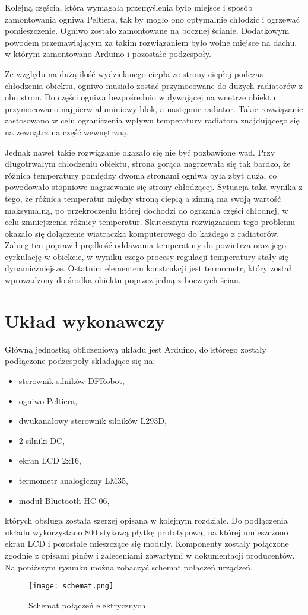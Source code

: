 Kolejną częścią, która wymagała przemyślenia było miejsce i sposób zamontowania ogniwa Peltiera, tak by mogło ono optymalnie chłodzić i ogrzewać pomieszczenie. Ogniwo zostało zamontowane na bocznej ścianie. Dodatkowym powodem przemawiającym za takim rozwiązaniem było wolne miejsce na dachu, w którym zamontowano Arduino i pozostałe podzespoły.

Ze względu na dużą ilość wydzielanego ciepła ze strony ciepłej podczas chłodzenia obiektu, ogniwo musiało zostać przymocowane do dużych radiatorów z obu stron. Do części ogniwa bezpośrednio wpływającej na wnętrze obiektu przymocowano najpierw aluminiowy blok, a następnie radiator. Takie rozwiązanie zastosowano w celu ograniczenia wpływu temperatury radiatora znajdującego się na zewnątrz na część wewnętrzną. 

Jednak nawet takie rozwiązanie okazało się nie być pozbawione wad. Przy długotrwałym chłodzeniu obiektu, strona gorąca nagrzewała się tak bardzo, że różnica temperatury pomiędzy dwoma stronami ogniwa była zbyt duża, co powodowało stopniowe nagrzewanie się strony chłodzącej. Sytuacja taka wynika z tego, że różnica temperatur między stroną ciepłą a zimną ma swoją wartość maksymalną, po przekroczeniu której dochodzi do ogrzania części chłodnej, w celu zmniejszenia różnicy temperatur. 
Skutecznym rozwiązaniem tego problemu okazało się dołączenie wiatraczka komputerowego do każdego z radiatorów. Zabieg ten poprawił prędkość oddawania temperatury do powietrza oraz jego cyrkulację w obiekcie, w wyniku czego procesy regulacji temperatury stały się dynamiczniejsze. Ostatnim elementem konstrukcji jest termometr, który został wprowadzony do środka obiektu poprzez jedną z bocznych ścian.

\section{Układ wykonawczy}
Główną jednostką obliczeniową układu jest Arduino, do którego zostały podłączone podzespoły składające się na:
\begin{itemize}
\item sterownik silników DFRobot,
\item ogniwo Peltiera,
\item dwukanałowy sterownik silników L293D,
\item 2 silniki DC,
\item ekran LCD 2x16,
\item termometr analogiczny LM35,
\item moduł Bluetooth HC-06,
\end{itemize}
których obsługa została szerzej opisana w kolejnym rozdziale.
Do podłączenia układu wykorzystano 800 stykową płytkę prototypową, na której umieszczono ekran LCD i pozostałe mieszczące się moduły. Komponenty zostały połączone zgodnie z opisami pinów i zaleceniami zawartymi w dokumentacji producentów. Na poniższym rysunku można zobaczyć schemat połączeń urządzeń.

\begin{figure}[H]
	\centering
	\texttt{[image: schemat.png]}
	\caption{Schemat połączeń elektrycznych}
\end{figure}

